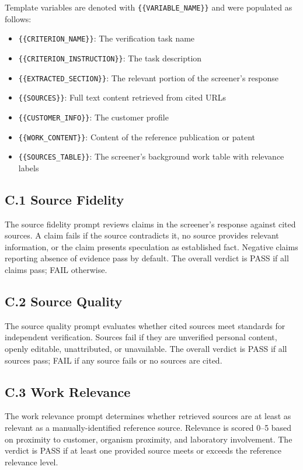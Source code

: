 \documentclass[utf8]{frontiers_suppmat}
\begin{document}
Template variables are denoted with \texttt{\{\{VARIABLE\_NAME\}\}} and were populated as follows:

\begin{itemize}
\item \texttt{\{\{CRITERION\_NAME\}\}}: The verification task name
\item \texttt{\{\{CRITERION\_INSTRUCTION\}\}}: The task description
\item \texttt{\{\{EXTRACTED\_SECTION\}\}}: The relevant portion of the screener's response
\item \texttt{\{\{SOURCES\}\}}: Full text content retrieved from cited URLs
\item \texttt{\{\{CUSTOMER\_INFO\}\}}: The customer profile
\item \texttt{\{\{WORK\_CONTENT\}\}}: Content of the reference publication or patent
\item \texttt{\{\{SOURCES\_TABLE\}\}}: The screener's background work table with relevance labels
\end{itemize}

\subsection{C.1 Source Fidelity}

The source fidelity prompt reviews claims in the screener's response against cited sources. A claim fails if the source contradicts it, no source provides relevant information, or the claim presents speculation as established fact. Negative claims reporting absence of evidence pass by default. The overall verdict is PASS if all claims pass; FAIL otherwise.

\subsection{C.2 Source Quality}

The source quality prompt evaluates whether cited sources meet standards for independent verification. Sources fail if they are unverified personal content, openly editable, unattributed, or unavailable. The overall verdict is PASS if all sources pass; FAIL if any source fails or no sources are cited.

\subsection{C.3 Work Relevance}

The work relevance prompt determines whether retrieved sources are at least as relevant as a manually-identified reference source. Relevance is scored 0--5 based on proximity to customer, organism proximity, and laboratory involvement. The verdict is PASS if at least one provided source meets or exceeds the reference relevance level.
\end{document}

